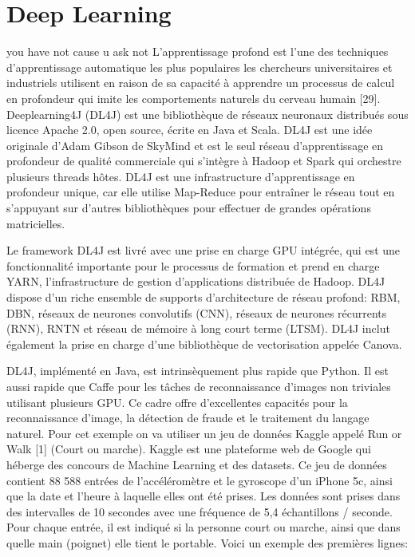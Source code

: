 \section{Deep Learning}
	\LARGE{you have not cause u ask not }
L'apprentissage profond est l'une des techniques d'apprentissage automatique les plus populaires
les chercheurs universitaires et industriels utilisent en raison de sa capacité à apprendre un processus de calcul en profondeur qui imite les comportements naturels du cerveau humain [29]. Deeplearning4J (DL4J) est une bibliothèque de réseaux neuronaux distribués sous licence Apache 2.0, open source, écrite en Java et Scala. DL4J est une idée originale d'Adam Gibson de SkyMind et est le seul réseau d'apprentissage en profondeur de qualité commerciale qui s'intègre à Hadoop et Spark qui orchestre plusieurs threads hôtes. DL4J est une infrastructure d'apprentissage en profondeur unique, car elle utilise Map-Reduce pour entraîner le réseau tout en s'appuyant sur d'autres bibliothèques pour effectuer de grandes opérations matricielles.

Le framework DL4J est livré avec une prise en charge GPU intégrée, qui est une fonctionnalité importante pour le processus de formation et prend en charge YARN, l'infrastructure de gestion d'applications distribuée de Hadoop. DL4J dispose d'un riche ensemble de supports d'architecture de réseau profond: RBM, DBN, réseaux de neurones convolutifs (CNN), réseaux de neurones récurrents (RNN), RNTN et réseau de mémoire à long court terme (LTSM). DL4J inclut également la prise en charge d'une bibliothèque de vectorisation appelée Canova.

DL4J, implémenté en Java, est intrinsèquement plus rapide que Python. Il est aussi rapide que Caffe pour les tâches de reconnaissance d'images non triviales utilisant plusieurs GPU. Ce cadre offre d'excellentes capacités pour la reconnaissance d'image, la détection de fraude et le traitement du langage naturel.
Pour cet exemple on va utiliser un jeu de données Kaggle appelé Run or Walk [1] (Court ou marche). Kaggle est une plateforme web de Google qui héberge des concours de Machine Learning et des datasets. Ce jeu de données contient 88 588 entrées de l’accéléromètre et le gyroscope d’un iPhone 5c, ainsi que la date et l’heure à laquelle elles ont été prises. Les données sont prises dans des intervalles de 10 secondes avec une fréquence de 5,4 échantillons / seconde. Pour chaque entrée, il est indiqué si la personne court ou marche, ainsi que dans quelle main (poignet) elle tient le portable. Voici un exemple des premières lignes:
